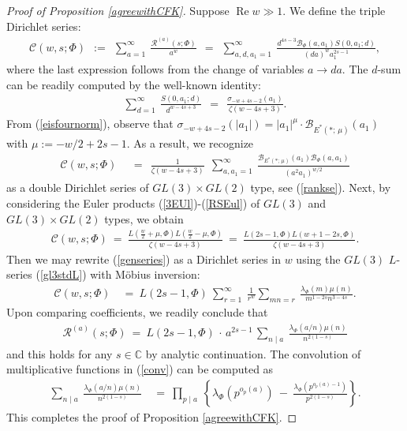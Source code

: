 \documentclass[11pt,reqno]{amsart}
\theoremstyle{definition}
\theoremstyle{definition}
\theoremstyle{remark}
\newcommand{\C}{\ensuremath{\mathbb{C}}}
\numberwithin{equation}{section}
\DeclareMathOperator{\re}{Re}
\begin{document}
\begin{proof}[Proof of Proposition \ref{agreewithCFK}]
Suppose $\re w \gg 1$.  We define the triple Dirichlet series:
\begin{align}
 \mathcal{C}(w,s; \Phi) \ \ := \ \   \sum_{a=1}^{\infty} \ \frac{	\mathcal{R}^{(a)}(s; \Phi) }{a^{w}}   \ \ = \ \  \sum_{a,d, a_{1}=1}^{\infty} \  \frac{d^{4s-3}\mathcal{B}_{\Phi}(a, a_{1}) S(0,a_{1};d)}{(da)^{w}a_{1}^{2s-1}},
\end{align}
where the last expression follows from the change of variables $a\to da$. The $d$-sum can be readily computed by the well-known identity:
\begin{align}
  \sum_{d=1}^{\infty} \ \frac{S(0, a_{1};d)}{d^{w-4s+3}} \ \ = \ \   \frac{\sigma_{-w+4s-2}(a_{1})}{\zeta(w-4s+3)}.
\end{align}
  From (\ref{eisfournorm}), observe that $	\sigma_{-w+4s-2}(|a_{1}|)  =  	 |a_{1}|^{\mu} \cdot \mathcal{B}_{E^{*}(*;\,  \mu)}(a_{1})$ with $\mu:= -w/2+2s-1$.  As a result,  we recognize 
 \begin{align}
 	\mathcal{C}(w,s; \Phi) \ \ &= \ \   \frac{1}{\zeta(w-4s+3)} \ \ \sum_{a, a_{1}=1}^{\infty} \  \frac{ \mathcal{B}_{E^{*}(*;\, \mu)}(a_{1}) \mathcal{B}_{\Phi}(a, a_{1})}{(a^2 a_{1})^{w/2}} 
 \end{align}
as a double Dirichlet series of  $GL(3)\times GL(2)$  type, see (\ref{rankse}).  Next, by considering the Euler products  (\ref{3EUl})-(\ref{RSEul}) of $GL(3)$ and $GL(3)\times GL(2)$ types, we obtain 
 \begin{align}\label{genseries}
 		\mathcal{C}(w,s; \Phi)	\ = \   \frac{L(\frac{w}{2}+\mu, \Phi) L(\frac{w}{2}-\mu, \Phi)}{\zeta(w-4s+3)} 
 	\ = \  \frac{L(2s-1, \Phi)L(w+1-2s, \Phi)}{\zeta(w-4s+3)}. 
 \end{align}
Then we may  rewrite (\ref{genseries})  as a Dirichlet series in $w$ using the $GL(3)$ $L$-series  (\ref{gl3stdL}) with M\"obius inversion:
  \begin{align}
  	\mathcal{C}(w,s; \Phi)
  	\  &= \ L(2s-1, \Phi) \ \sum_{r=1}^{\infty} \ \frac{1}{r^{w}} \sum_{mn=r} \ \frac{\lambda_{\Phi}(m)\mu(n)}{m^{1-2s}n^{3-4s}}.
  \end{align}
Upon comparing coefficients,  we readily conclude that
  \begin{align}\label{conv}
  	\mathcal{R}^{(a)}(s;  \Phi) \ = \ L(2s-1, \Phi) \, \cdot\,     a^{2s-1}  \, \sum_{n\mid a} \ \frac{\lambda_{\Phi}(a/n)\mu(n)}{n^{2(1-s)}}
  \end{align}
and this holds for any $s\in \C$ by analytic continuation. The convolution of  multiplicative functions in (\ref{conv}) can be computed as
\begin{align}
 \sum_{n\mid a} \ \frac{\lambda_{\Phi}(a/n)\mu(n)}{n^{2(1-s)}}
	\ &= \       \prod_{p\mid a} \ \left\{  \lambda_{\Phi}(p^{o_{p}(a)}) \ - \   \frac{\lambda_{\Phi}(p^{o_{p}(a)-1})}{p^{2(1-s)}}  \right\}.
\end{align}
This completes the proof of Proposition \ref{agreewithCFK}.
\end{proof}
\end{document}
